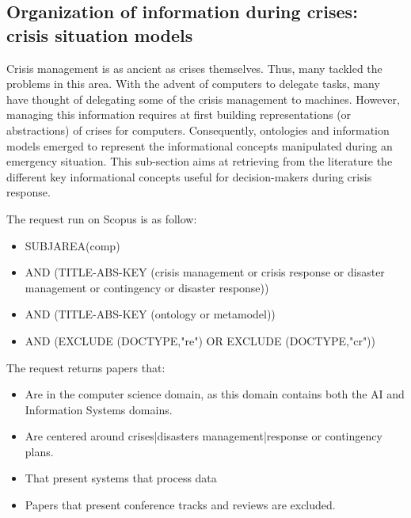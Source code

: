 \subsection{Organization of information during crises: crisis situation models}
\label{sec:lit-information-models}
Crisis management is as ancient as crises themselves.
Thus, many tackled the problems in this area.
With the advent of computers to delegate tasks, many have thought of delegating some of the crisis management to machines.
However, managing this information requires at first building representations (or abstractions) of crises for computers.
Consequently, ontologies and information models emerged to represent the informational concepts manipulated during an emergency situation.
This sub-section aims at retrieving from the literature the different key informational concepts useful for decision-makers during crisis response.

The request run on Scopus is as follow:
\begin{itemize}
    \item SUBJAREA(comp)
    \item AND (TITLE-ABS-KEY ({crisis management} or {crisis response} or {disaster management} or contingency or {disaster response}))
    \item AND (TITLE-ABS-KEY (ontology or metamodel))
    \item AND (EXCLUDE (DOCTYPE,"re") OR EXCLUDE (DOCTYPE,"cr"))
\end{itemize}

The request returns papers that:
\begin{itemize}
    \item Are in the computer science domain, as this domain contains both the AI and Information Systems domains.
    \item Are centered around crises|disasters management|response or contingency plans.
    \item That present systems that process data
    \item Papers that present conference tracks and reviews are excluded.
\end{itemize}

